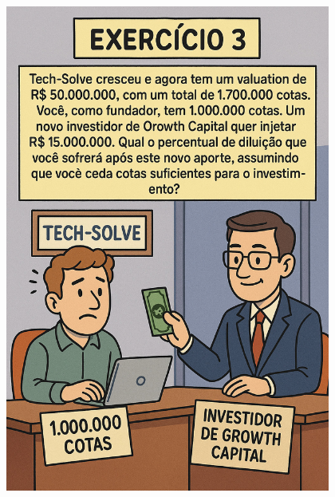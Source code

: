 \documentclass[
]{book}
\begin{document}
\includegraphics[width=4.20833in,height=\textheight]{images/03-2025-08-19_20/exercicio-03.jpg}
\end{document}
